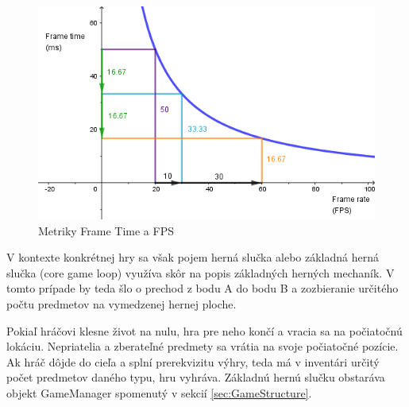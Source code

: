 \documentclass[slovak, master]{diploma}
\begin{document}
\begin{figure}[!htbp]
    \centering
    \includegraphics[width=.8\textwidth]{Figures/frameTimeVsFPS.png}
    \caption{Metriky Frame Time a FPS \cite{FrameTimeFPS}}
    \label{pic:FrameTimeFPS}
\end{figure}

V kontexte konkrétnej hry sa však pojem herná slučka alebo základná herná slučka (core game loop) využíva skôr na popis základných herných mechaník. V tomto prípade by teda šlo o prechod z bodu A do bodu B a zozbieranie určitého počtu predmetov na vymedzenej hernej ploche.

Pokiaľ hráčovi klesne život na nulu, hra pre neho končí a vracia sa na počiatočnú lokáciu. Nepriatelia a zberateľné predmety sa vrátia na svoje počiatočné pozície. Ak hráč dôjde do cieľa a splní prerekvizitu výhry, teda má v inventári určitý počet predmetov daného typu, hru vyhráva. Základnú hernú slučku obstaráva objekt GameManager spomenutý v sekcií \ref{sec:GameStructure}. 
\end{document}
